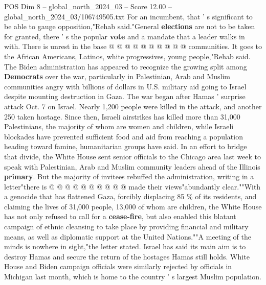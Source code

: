 \begin{textsample}{POS Dim 8 – global\_north\_2024\_03 – Score 12.00 – global\_north\_2024\_03/106749505.txt}
For an incumbent, that ' s significant to be able to gauge opposition,"Rehab said."General \textbf{elections} are not to be taken for granted, there ' s the popular \textbf{vote} and a mandate that a leader walks in with.
There is unrest in the base @ @ @ @ @ @ @ @ @ @ communities.
It goes to the African Americans, Latinos, white progressives, young people,"Rehab said.
The Biden administration has appeared to recognize the growing split among \textbf{Democrats} over the war, particularly in Palestinian, Arab and Muslim communities angry with billions of dollars in U.S. military aid going to Israel despite mounting destruction in Gaza.
The war began after Hamas ' surprise attack Oct. 7 on Israel.
Nearly 1,200 people were killed in the attack, and another 250 taken hostage.
Since then, Israeli airstrikes has killed more than 31,000 Palestinians, the majority of whom are women and children, while Israeli blockades have prevented sufficient food and aid from reaching a population heading toward famine, humanitarian groups have said.
In an effort to bridge that divide, the White House sent senior officials to the Chicago area last week to speak with Palestinian, Arab and Muslim community leaders ahead of the Illinois \textbf{primary}.
But the majority of invitees rebuffed the administration, writing in a letter"there is @ @ @ @ @ @ @ @ @ @ made their views"abundantly clear.""With a genocide that has flattened Gaza, forcibly displacing 85 \% of its residents, and claiming the lives of 31,000 people, 13,000 of whom are children, the White House has not only refused to call for a \textbf{cease-fire}, but also enabled this blatant campaign of ethnic cleansing to take place by providing financial and military means, as well as diplomatic support at the United Nations.""A meeting of the minds is nowhere in sight,"the letter stated.
Israel has said its main aim is to destroy Hamas and secure the return of the hostages Hamas still holds.
White House and Biden campaign officials were similarly rejected by officials in Michigan last month, which is home to the country ' s largest Muslim population.

\end{textsample}
